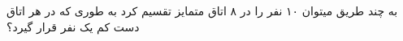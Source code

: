 به چند طریق میتوان ۱۰ نفر را در ۸ اتاق متمایز تقسیم کرد به طوری که در هر اتاق دست کم یک نفر قرار گیرد؟